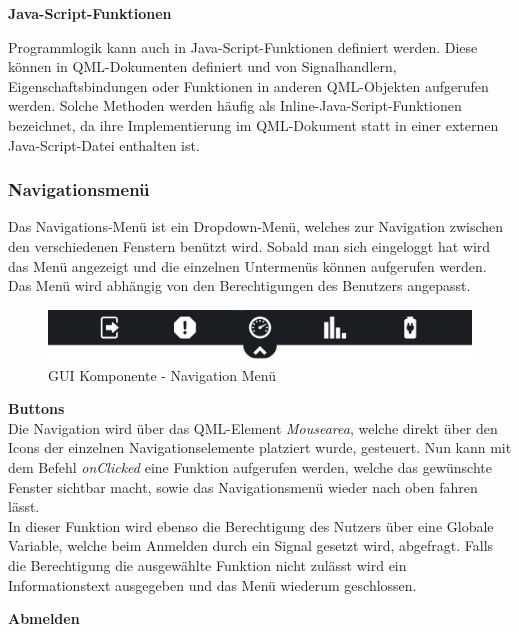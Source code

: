 \textbf{Java-Script-Funktionen}\\
\vspace{2mm}

Programmlogik kann auch in Java-Script-Funktionen definiert werden. Diese können in QML-Dokumenten definiert und von Signalhandlern, Eigenschaftsbindungen oder Funktionen in anderen QML-Objekten aufgerufen werden. Solche Methoden werden häufig als Inline-Java-Script-Funktionen bezeichnet, da ihre Implementierung im QML-Dokument statt in einer externen Java-Script-Datei enthalten ist.

\subsubsection{Navigationsmenü}

Das Navigations-Menü ist ein Dropdown-Menü, welches zur Navigation zwischen den verschiedenen Fenstern benützt wird. Sobald man sich eingeloggt hat wird das Menü angezeigt und die einzelnen Untermenüs können aufgerufen werden. Das Menü wird abhängig von den Berechtigungen des Benutzers angepasst.

\begin{figure}[H]
	\begin{center}
		\includegraphics[scale=0.2]{figures/hcis/component_menu.png}
		\caption{GUI Komponente - Navigation Menü}
		\label{fig:kompNavigation}
	\end{center}
\end{figure}

\textbf{Buttons} \\
\vspace{2mm}
Die Navigation wird über das QML-Element \textit{Mousearea}, welche direkt über den Icons der einzelnen Navigationselemente platziert wurde, gesteuert. Nun kann mit dem Befehl \textit{onClicked} eine Funktion aufgerufen werden, welche das gewünschte Fenster sichtbar macht, sowie das Navigationsmenü wieder nach oben fahren lässt.\\
In dieser Funktion wird ebenso die Berechtigung des Nutzers über eine Globale Variable, welche beim Anmelden durch ein Signal gesetzt wird, abgefragt. Falls die Berechtigung die ausgewählte Funktion nicht zulässt wird ein Informationstext ausgegeben und das Menü wiederum geschlossen.\

\textbf{Abmelden} \\
\vspace{2mm}

